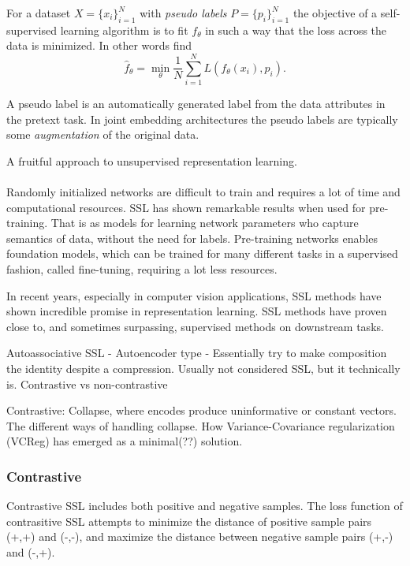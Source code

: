\documentclass[../../thesis.tex]{subfiles}
\begin{document}
For a dataset $X = \{x_i\}_{i=1}^N$ with \textit{pseudo labels} $P = \{p_i\}_{i=1}^N$ the objective of a self-supervised learning algorithm is to fit $f_\theta$ in such a way that the loss across the data is minimized. In other words find 
\begin{equation}
    \widehat{f}_\theta = \min_\theta \frac{1}{N} \sum_{i=1}^N L(f_\theta(x_i),p_i).
\end{equation}

A pseudo label is an automatically generated label from the data attributes in the pretext task. In joint embedding architectures the pseudo labels are typically some \textit{augmentation} of the original data.



A fruitful approach to unsupervised representation learning.\\\\

Randomly initialized networks are difficult to train and requires a lot of time and computational resources. SSL has shown remarkable results when used for pre-training. That is as models for learning network parameters who capture semantics of data, without the need for labels. Pre-training networks enables foundation models, which can be trained for many different tasks in a supervised fashion, called fine-tuning, requiring a lot less resources.

In recent years, especially in computer vision applications, SSL methods have shown incredible promise in representation learning. SSL methods have proven close to, and sometimes surpassing, supervised methods on downstream tasks. 


Autoassociative SSL - Autoencoder type - Essentially try to make composition the identity despite a compression. Usually not considered SSL, but it technically is. 
Contrastive vs non-contrastive

Contrastive: Collapse, where encodes produce uninformative or constant vectors. The different ways of handling collapse. How Variance-Covariance regularization (VCReg) \cite{mialon2024variance} has emerged as a minimal(??) solution. 


\subsubsection{Contrastive}
Contrastive SSL includes both positive and negative samples. The loss function of contrasitive SSL attempts to minimize the distance of positive sample pairs (+,+) and (-,-), and maximize the distance between negative sample pairs (+,-) and (-,+).\\\\
\end{document}
